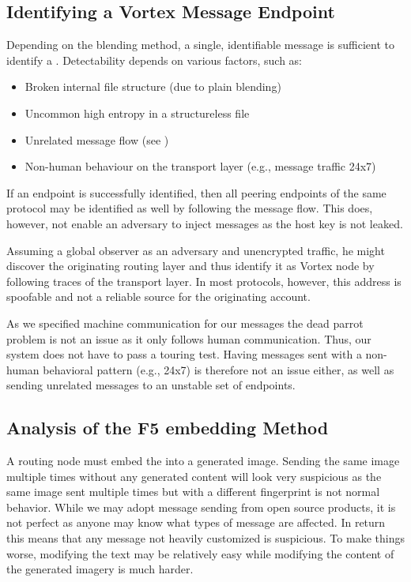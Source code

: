 \subsection{Identifying a Vortex Message Endpoint}
Depending on the blending method, a single, identifiable message is sufficient to identify a \VortexNode. Detectability depends on various factors, such as:

\begin{itemize}
	\item Broken internal file structure (due to plain blending)
	\item Uncommon high entropy in a structureless file
	\item Unrelated message flow (see \cite{oakland2013-parrot})
	\item Non-human behaviour on the transport layer (e.g., message traffic 24x7)
\end{itemize}

If an endpoint is successfully identified, then all peering endpoints of the same protocol may be identified as well by following the message flow. This does, however, not enable an adversary to inject messages as the host key is not leaked. 

Assuming a global observer as an adversary and unencrypted traffic, he might discover the originating routing layer and thus identify it as Vortex node by following traces of the transport layer. In most protocols, however, this address is spoofable and not a reliable source for the originating account.

As we specified machine communication for our messages the dead parrot problem\cite{oakland2013-parrot} is not an issue as it only follows human communication. Thus, our system does not have to pass a touring test. Having messages sent with a non-human behavioral pattern (e.g., 24x7) is therefore not an issue either, as well as sending unrelated messages to an unstable set of endpoints. 

\subsection{Analysis of the F5 embedding Method}
A routing node must embed the \VortexMessage into a generated image. Sending the same image multiple times without any generated content will look very suspicious as the same image sent multiple times but with a different fingerprint is not normal behavior. While we may adopt message sending from open source products, it is not perfect as anyone may know what types of message are affected. In return this means that any message not heavily customized is suspicious. To make things worse, modifying the text may be relatively easy while modifying the content of the generated imagery is much harder.

